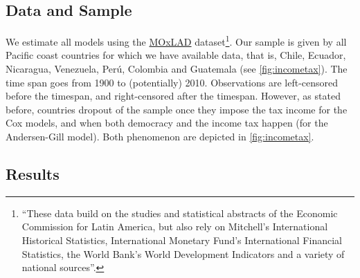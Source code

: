 \documentclass[onesided]{article}\usepackage[]{graphicx}\usepackage[]{color}
\begin{document}
\subsection{Data and Sample\label{data}}

We estimate all models using the \href{http://moxlad-staging.herokuapp.com/home/en?}{MOxLAD} dataset\footnote{``These data build on the studies and statistical abstracts of the Economic Commission for Latin America, but also rely on Mitchell's International Historical Statistics, International Monetary Fund's International Financial Statistics, the World Bank's World Development Indicators and a variety of national sources''.}. Our sample is given by all Pacific coast countries for which we have available data, that is, Chile, Ecuador, Nicaragua, Venezuela, Per\'u, Colombia and Guatemala (see \autoref{fig:incometax}). The time span goes from 1900 to (potentially) 2010. Observations are left-censored before the timespan, and right-censored after the timespan. However, as stated before, countries dropout of the sample once they impose the tax income for the Cox models, and when both democracy and the income tax happen (for the Andersen-Gill model). Both phenomenon are depicted in \autoref{fig:incometax}.

\subsection{Results}
\end{document}
